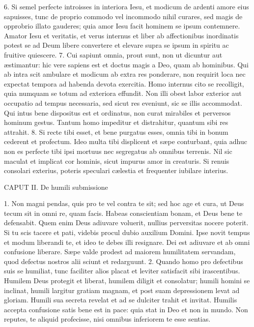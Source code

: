 \documentclass[twoside]{article}
\begin{document}
6. Si semel perfecte introisses in interiora Iesu, et modicum de ardenti amore eius sapuisses, tunc de proprio commodo vel incommodo nihil curares, sed magis de opprobrio illato gauderes; quia amor Iesu facit hominem se ipsum contemnere. Amator Iesu et veritatis, et verus internus et liber ab affectionibus inordinatis potest se ad Deum libere convertere et elevare supra se ipsum in spiritu ac fruitive quiescere.
7. Cui sapiunt omnia, prout sunt, non ut dicuntur aut æstimantur: hic vere sapiens est et doctus magis a Deo, quam ab hominibus. Qui ab intra scit ambulare et modicum ab extra res ponderare, non requirit loca nec expectat tempora ad habenda devota exercitia. Homo internus cito se recolligit, quia numquam se totum ad exteriora effundit. Non illi obest labor exterior aut occupatio ad tempus necessaria, sed sicut res eveniunt, sic se illis accommodat. Qui intus bene dispositus est et ordinatus, non curat mirabiles et perversos hominum gestus. Tantum homo impeditur et distrahitur, quantum sibi res attrahit.
8. Si recte tibi esset, et bene purgatus esses, omnia tibi in bonum cederent et profectum. Ideo multa tibi displicent et sæpe conturbant, quia adhuc non es perfecte tibi ipsi mortuus nec segregatus ab omnibus terrenis. Nil sic maculat et implicat cor hominis, sicut impurus amor in creaturis. Si renuis consolari exterius, poteris speculari cælestia et frequenter iubilare interius.


CAPUT II.
De humili submissione

1. Non magni pendas, quis pro te vel contra te sit; sed hoc age et cura, ut Deus tecum sit in omni re, quam facis. Habeas conscientiam bonam, et Deus bene te defensabit. Quem enim Deus adiuvare voluerit, nullius perversitas nocere poterit. Si tu scis tacere et pati, videbis procul dubio auxilium Domini. Ipse novit tempus et modum liberandi te, et ideo te debes illi resignare. Dei est adiuvare et ab omni confusione liberare. Sæpe valde prodest ad maiorem humilitatem servandam, quod defectus nostros alii sciunt et redarguunt.
2. Quando homo pro defectibus suis se humiliat, tunc faciliter alios placat et leviter satisfacit sibi irascentibus. Humilem Deus protegit et liberat, humilem diligit et consolatur; humili homini se inclinat, humili largitur gratiam magnam, et post suam depressionem levat ad gloriam. Humili sua secreta revelat et ad se dulciter trahit et invitat. Humilis accepta confusione satis bene est in pace: quia stat in Deo et non in mundo. Non reputes, te aliquid profecisse, nisi omnibus inferiorem te esse sentias.
\end{document}
